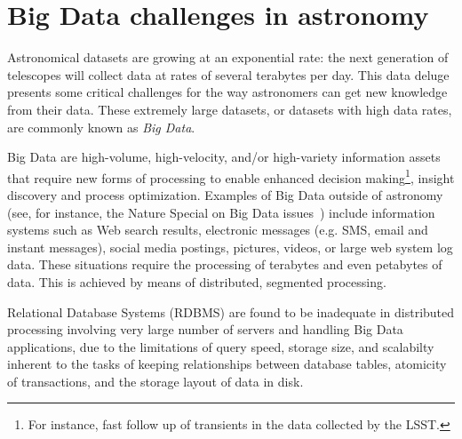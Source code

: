 \chapter{Big Data challenges in astronomy} %
\label{theproblem}

Astronomical datasets are growing at an exponential rate: the next generation of telescopes will collect data at rates of
several terabytes %
per day. This data
deluge %
presents some critical challenges for the way astronomers
can
get new knowledge from their data.
These extremely large datasets, or datasets with high data rates, are commonly known as
\emph{Big Data}.

Big Data are high-volume, high-velocity, and/or high-variety information assets that require new forms of processing to enable enhanced
decision making\footnote{For instance, fast follow up of transients in the data collected by the LSST.}, %
insight discovery and process optimization. Examples of Big Data
outside of astronomy (see, for instance, the Nature Special on Big Data issues~\cite{Nat_01})
include information
systems
such as Web search results, electronic messages (e.g. SMS, email and instant messages), social media postings, pictures, videos, 
or large web %
system log data.
These situations require the %
processing of terabytes and even petabytes of data. This is achieved by
means of
distributed, segmented
processing.

Relational Database Systems (RDBMS)
are found to be inadequate in distributed processing involving very large number of servers and handling Big Data applications, due to the limitations of query speed, storage size, and scalabilty inherent to the tasks of keeping relationships between database tables, atomicity of transactions, and the storage layout of data in disk.


